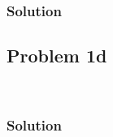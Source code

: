 \documentclass[conf]{new-aiaa}
\begin{document}
\begin{center}
	 \\
\end{center}


\subsubsection*{Solution} 





\subsection*{Problem 1d} 

\begin{center}
	 \\
\end{center}


\subsubsection*{Solution} 




\end{document}
